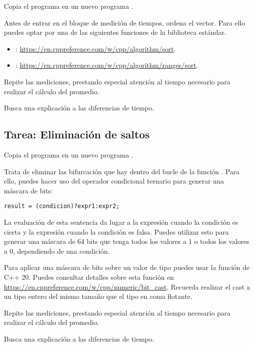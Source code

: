 Copia el programa  en un nuevo programa .

Antes de entrar en el bloque de medición de tiempos, ordena el vector. Para ello
puedes optar por una de las siguientes funciones de la biblioteca estándar.

\begin{itemize}
  \item {}: \url{https://en.cppreference.com/w/cpp/algorithm/sort}.
  \item {}: \url{https://en.cppreference.com/w/cpp/algorithm/ranges/sort}.
\end{itemize}

Repite las mediciones, prestando especial atención al tiempo necesario para
realizar el cálculo del promedio. 

Busca una explicación a las diferencias de tiempo.

\subsection{Tarea: Eliminación de saltos}

Copia el programa  en un nuevo programa .

Trata de eliminar las bifurcación que hay dentro del bucle de la función . 
Para ello, puedes hacer uso del operador condicional ternario para generar una máscara de bits:

\begin{lstlisting}
result = (condicion)?expr1:expr2;
\end{lstlisting}

La evaluación de esta sentencia da lugar a la expresión  cuando la condición
es cierta y la expresión  cuando la condición es falsa.
Puedes utilizar esto para generar una máscara de 64 bits que tenga todos los valores a 1
o todos los valores a 0, dependiendo de una condición.

Para aplicar una máscara de bits sobre un valor de tipo  puedes usar
la función  de C++ 20. Puedes consultar detalles sobre esta
función en \url{https://en.cppreference.com/w/cpp/numeric/bit_cast}.
Recuerda realizar el cast a un tipo entero del mismo tamaño que el tipo en coma flotante.

Repite las mediciones, prestando especial atención al tiempo necesario para
realizar el cálculo del promedio. 

Busca una explicación a las diferencias de tiempo.
